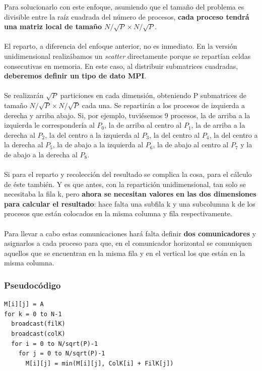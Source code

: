 Para solucionarlo con este enfoque, asumiendo que el tamaño del problema es divisible entre la raíz cuadrada del número de procesos, \textbf{cada proceso tendrá una matriz local de tamaño $N/\sqrt{P} \times N/\sqrt{P}$}.
\\ \\
El reparto, a diferencia del enfoque anterior, no es inmediato. En la versión unidimensional realizábamos un \textit{scatter} directamente porque se repartían celdas consecutivas en memoria. En este caso, al distribuir submatrices cuadradas, \textbf{deberemos definir un tipo de dato MPI}.
\\ \\
Se realizarán $\sqrt{P}$ particiones en cada dimensión, obteniendo P submatrices de tamaño $N/\sqrt{P} \times N/\sqrt{P}$ cada una. Se repartirán a los procesos de izquierda a derecha y arriba abajo. Si, por ejemplo, tuviésemos 9 procesos, la de arriba a la izquierda le correspondería al $P_{0}$, la de arriba al centro al $P_{1}$, la de arriba a la derecha al $P_{2}$, la del centro a la izquierda al $P_{3}$, la del centro al $P_{4}$, la del centro a la derecha al $P_{5}$, la de abajo a la izquierda al $P_{6}$, la de abajo al centro al $P_{7}$ y la de abajo a la derecha al $P_{8}$.
\\ \\
Si para el reparto y recolección del resultado se complica la cosa, para el cálculo de éste también. Y es que antes, con la repartición unidimensional, tan solo se necesitaba la fila k, pero \textbf{ahora se necesitan valores en las dos dimensiones para calcular el resultado}: hace falta una subfila k y una subcolumna k de los procesos que están colocados en la misma columna y fila respectivamente.
\\ \\
Para llevar a cabo estas comunicaciones hará falta definir \textbf{dos comunicadores} y asignarlos a cada proceso para que, en el comunicador horizontal se comuniquen aquellos que se encuentran en la misma fila y en el vertical los que están en la misma columna.

\subsubsection{Pseudocódigo}

\begin{lstlisting}[style=c]
M[i][j] = A
for k = 0 to N-1
  broadcast(filK)
  broadcast(colK)
  for i = 0 to N/sqrt(P)-1
    for j = 0 to N/sqrt(P)-1
      M[i][j] = min(M[i][j], ColK[i] + FilK[j])
\end{lstlisting}

